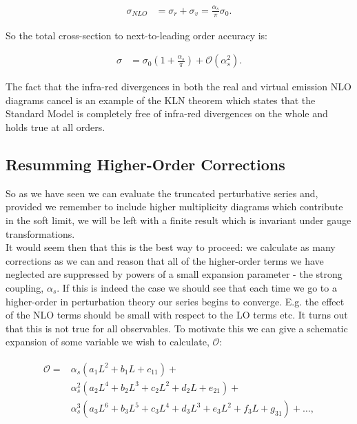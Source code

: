 			\begin{align}
				\sigma_{NLO} &= \sigma_r + \sigma_v = \frac{\alpha_s}{\pi}\sigma_0.
			\end{align}

			So the total cross-section to next-to-leading order accuracy is:

			\begin{align}
				\sigma &= \sigma_0\left(1 + \frac{\alpha_s}{\pi}\right) + \mathcal{O}(\alpha_s^2).
			\end{align}


			The fact that the infra-red divergences in both the real and virtual emission NLO diagrams cancel is an example of the
			KLN theorem which states that the Standard Model is completely free of infra-red divergences on the whole and holds
			true at all orders.

	\subsection{Resumming Higher-Order Corrections}

		So as we have seen we can evaluate the truncated perturbative series and, provided we remember to include higher
		multiplicity diagrams which contribute in the soft limit, we will be left with a finite result which is invariant
		under gauge transformations.\\ It would seem then that this is the best way to proceed: we calculate as many corrections
		as we can and reason that all of the higher-order terms we have neglected are suppressed by powers of a small expansion
		parameter - the strong coupling, $\alpha_s$.  If this is indeed the case we should see that each time we go to a higher-order
		in perturbation theory our series begins to converge.  E.g. the effect of the NLO terms should be small with respect
		to the LO terms etc.  It turns out that this is not true for all observables.  To motivate this we can give a schematic expansion
		of some variable we wish to calculate, $\mathcal{O}$:

		\begin{align}
		\begin{split}
			\mathcal{O} = &\alpha_s  \left(a_1L^2 + b_1L   + c_11\right) + \\
			              &\alpha_s^2\left(a_2L^4 + b_2L^3 + c_2L^2 + d_2L   + e_21\right) + \\
			              &\alpha_s^3\left(a_3L^6 + b_3L^5 + c_3L^4 + d_3L^3 + e_3L^2 + f_3L + g_31\right) + \ldots,
			\label{eqn:schematicExpn}
		\end{split}
		\end{align}

